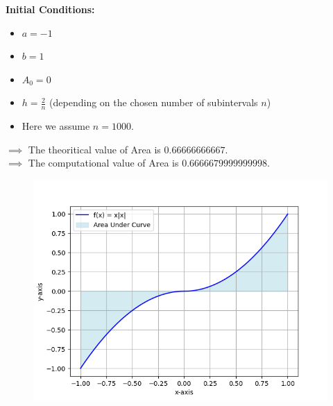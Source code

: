 \documentclass[journal,12pt,onecolumn]{IEEEtran}
\theoremstyle{remark}
\begin{document}
\textbf{Initial Conditions:}
\begin{itemize}
    \item $a = -1$
    \item $b = 1$
    \item $A_0 = 0$
    \item $h = \frac{2}{n}$ (depending on the chosen number of subintervals $n$)
    \item Here we assume $n = 1000$.
\end{itemize}

$ \implies$ The theoritical value of Area is $0.66666666667$.\\
$ \implies$ The computational value of Area is $0.6666679999999998$.\\

\begin{figure}[h]
	\centering
	\includegraphics[width=\columnwidth]{figs/fig.png}
\end{figure}
\end{document}
